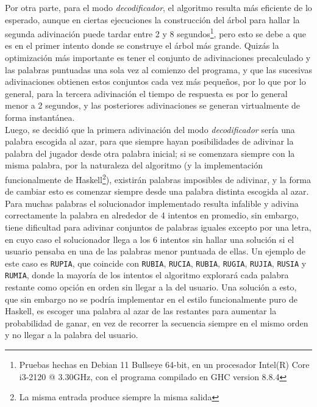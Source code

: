 \documentclass[11pt]{article}
\begin{document}
Por otra parte, para el modo \emph{decodificador}, el algoritmo resulta más eficiente de lo
esperado, aunque en ciertas ejecuciones la construcción del árbol para hallar la segunda
adivinación puede tardar entre 2 y 8 segundos\footnote{Pruebas hechas en Debian 11 Bullseye 64-bit,
en un procesador Intel(R) Core i3-2120 @ 3.30GHz, con el programa compilado en GHC version 8.8.4},
pero esto se debe a que es en el primer intento donde se construye el árbol más grande. Quizás la
optimización más importante es tener el conjunto de adivinaciones precalculado y las palabras
puntuadas una sola vez al comienzo del programa, y que las sucesivas adivinaciones obtienen
estos conjuntos cada vez más pequeños, por lo que por lo general, para la tercera adivinación
el tiempo de respuesta es por lo general menor a 2 segundos, y las posteriores adivinaciones
se generan virtualmente de forma instantánea. \\

Luego, se decidió que la primera adivinación del modo \emph{decodificador} sería una palabra
escogida al azar, para que siempre hayan posibilidades de adivinar la palabra del jugador
desde otra palabra inicial; si se comenzara siempre con la misma palabra, por
la naturaleza del algoritmo (y la implementación funcionalmente de Haskell\footnote{La
misma entrada produce siempre la misma salida}), existirán palabras imposibles de
adivinar, y la forma de cambiar esto es comenzar siempre desde una palabra
distinta escogida al azar. \\

Para muchas palabras el solucionador implementado resulta infalible y adivina
correctamente la palabra en alrededor de 4 intentos en promedio, sin embargo,
tiene dificultad para adivinar conjuntos de palabras iguales excepto por una letra,
en cuyo caso el solucionador llega a los 6 intentos sin hallar una solución si
el usuario pensaba en una de las palabras menor puntuada de ellas. Un ejemplo de este caso
es \texttt{RUPIA}, que coincide con \texttt{RUBIA}, \texttt{RUCIA}, \texttt{RUBIA},
\texttt{RUGIA}, \texttt{RUJIA}, \texttt{RUSIA} y \texttt{RUMIA}, donde la mayoría
de los intentos el algoritmo explorará cada palabra restante como opción en orden sin llegar
a la del usuario. Una solución a esto, que sin embargo no se podría implementar en
el estilo funcionalmente puro de Haskell, es escoger una palabra al azar de las
restantes para aumentar la probabilidad de ganar, en vez de recorrer la secuencia
siempre en el mismo orden y no llegar a la palabra del usuario.
\end{document}
